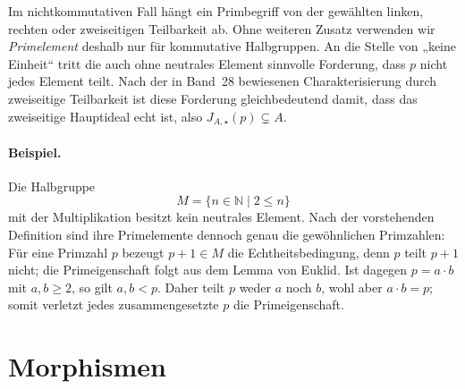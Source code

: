\documentclass[main.tex]{subfiles}
\begin{document}
Im nichtkommutativen Fall hängt ein Primbegriff von der gewählten linken,
rechten oder zweiseitigen Teilbarkeit ab.  Ohne weiteren Zusatz verwenden
wir \emph{Primelement} deshalb nur für kommutative Halbgruppen.  An die Stelle
von „keine Einheit“ tritt die auch ohne neutrales Element sinnvolle
Forderung, dass \(p\) nicht jedes Element teilt. Nach der in Band~28
bewiesenen Charakterisierung durch zweiseitige Teilbarkeit ist diese
Forderung gleichbedeutend damit, dass das zweiseitige Hauptideal echt ist,
also \(J_{A,\star}(p)\subsetneq A\).


\paragraph{Beispiel.}
Die Halbgruppe
\[
  M=\{n\in\mathbb N\mid 2\leq n\}
\]
mit der Multiplikation besitzt kein neutrales Element.  Nach der vorstehenden
Definition sind ihre Primelemente dennoch genau die gewöhnlichen Primzahlen:
Für eine Primzahl \(p\) bezeugt \(p+1\in M\) die Echtheitsbedingung, denn
\(p\) teilt \(p+1\) nicht; die Primeigenschaft folgt aus dem Lemma von
Euklid.  Ist dagegen \(p=a\cdot b\) mit \(a,b\geq2\), so gilt
\(a,b<p\).  Daher teilt \(p\) weder \(a\) noch \(b\), wohl aber
\(a\cdot b=p\); somit verletzt jedes zusammengesetzte \(p\) die
Primeigenschaft.

\section{Morphismen}

\end{document}

